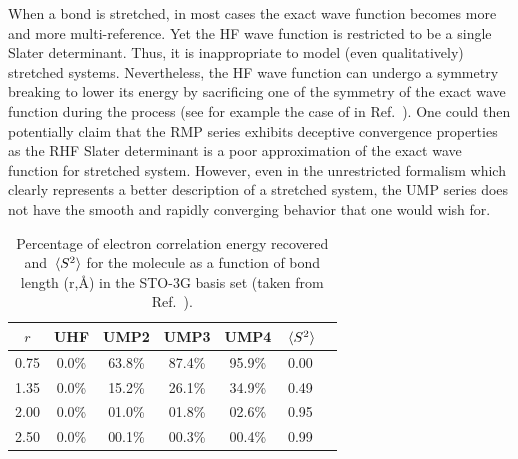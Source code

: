 \documentclass[11pt,a4paper]{article}
\begin{document}
When a bond is stretched, in most cases the exact wave function becomes more and more multi-reference. Yet the HF wave function is restricted to be a single Slater determinant.
Thus, it is inappropriate to model (even qualitatively) stretched systems. Nevertheless, the HF wave function can undergo a symmetry breaking to lower its energy by sacrificing one of the symmetry of the exact wave function during the process (see for example the case of  in Ref.~\cite{SzaboBook}). 
One could then potentially claim that the RMP series exhibits deceptive convergence properties as the RHF Slater determinant is a poor approximation of the exact wave function for stretched system. However, even in the unrestricted formalism which clearly represents a better description of a stretched system, the UMP series does not have the smooth and rapidly converging behavior that one would wish for. 

\begin{table}[h!]
    \centering
    \caption{Percentage of electron correlation energy recovered and $\expval*{S^2}$ for the  molecule as a function of bond length (r,\si{\angstrom}) in the STO-3G basis set (taken from Ref.~\cite{Gill_1988}).}
    \begin{tabular}{ccccccc}
\hline
\hline
 $r$ & UHF & UMP2 & UMP3 & UMP4 & $\expval*{S^2}$ \\
\hline
0.75 & 0.0\% & 63.8\% & 87.4\% & 95.9\% & 0.00\\
1.35 & 0.0\% & 15.2\% & 26.1\% & 34.9\% & 0.49\\
2.00 & 0.0\% & 01.0\% & 01.8\% & 02.6\% & 0.95\\
2.50 & 0.0\% & 00.1\% & 00.3\% & 00.4\% & 0.99\\
\hline
\hline
\end{tabular}
    \label{tab:SpinContamination}
\end{table}
\end{document}
